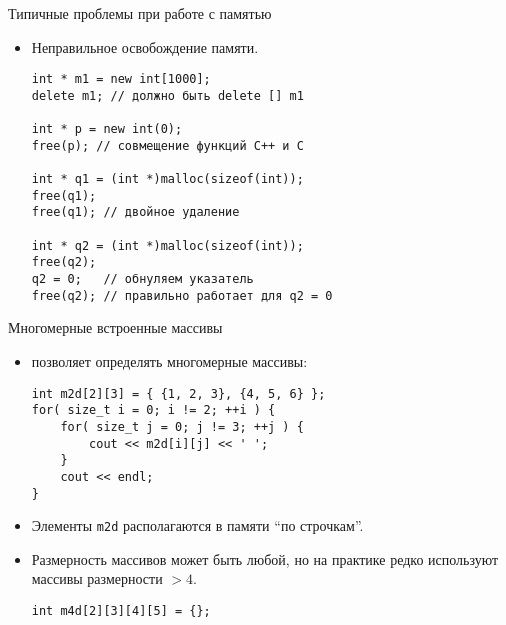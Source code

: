 \documentclass{beamer}
\begin{document}
\begin{frame}[fragile]{Типичные проблемы при работе с памятью}
    \begin{itemize}
    \item Неправильное освобождение памяти.
\begin{lstlisting}
int * m1 = new int[1000];
delete m1; // должно быть delete [] m1

int * p = new int(0);
free(p); // совмещение функций C++ и C

int * q1 = (int *)malloc(sizeof(int));
free(q1);
free(q1); // двойное удаление

int * q2 = (int *)malloc(sizeof(int));
free(q2);
q2 = 0;   // обнуляем указатель
free(q2); // правильно работает для q2 = 0
\end{lstlisting}
\end{itemize}
\end{frame}

\begin{frame}[fragile]{Многомерные встроенные массивы}
    \begin{itemize}
        \item \langcpp позволяет определять многомерные массивы:
        \begin{lstlisting}
int m2d[2][3] = { {1, 2, 3}, {4, 5, 6} };
for( size_t i = 0; i != 2; ++i ) {
    for( size_t j = 0; j != 3; ++j ) {
        cout << m2d[i][j] << ' ';
    }
    cout << endl;
}
        \end{lstlisting}
    \item Элементы {\tt m2d} располагаются в памяти ``по строчкам''.
    \item Размерность массивов может быть любой, но на практике
        редко используют массивы размерности $> 4$.
\begin{lstlisting}
int m4d[2][3][4][5] = {};
\end{lstlisting}
    \end{itemize}
\end{frame}
\end{document}
